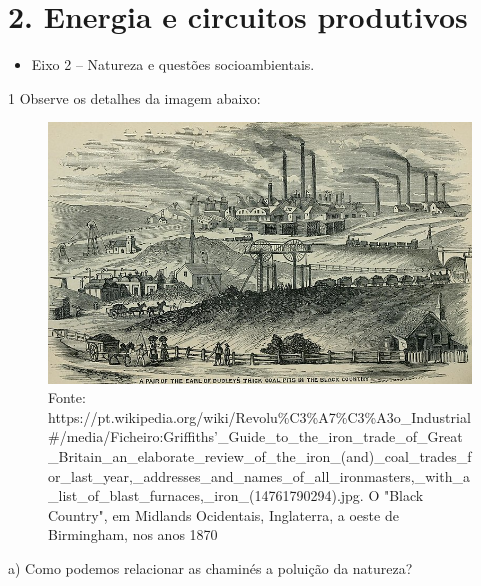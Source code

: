 \chapter{2. Energia e circuitos produtivos}




\begin{itemize}
\item Eixo 2 -- Natureza e questões socioambientais.
\end{itemize}

\num{1} Observe os detalhes da imagem abaixo:

\begin{figure}[htpb!]
\includegraphics[width=\textwidth]{./imgs/img5.jpg}
\caption{Fonte: https://pt.wikipedia.org/wiki/Revolu\%C3\%A7\%C3\%A3o\_Industrial\#/media/Ficheiro:Griffiths'\_Guide\_to\_the\_iron\_trade\_of\_Great\_Britain\_an\_elaborate\_review\_of\_the\_iron\_(and)\_coal\_trades\_for\_last\_year,\_addresses\_and\_names\_of\_all\_ironmasters,\_with\_a\_list\_of\_blast\_furnaces,\_iron\_(14761790294).jpg. O "Black Country", em Midlands Ocidentais, Inglaterra, a oeste de Birmingham, nos anos 1870}
\end{figure}


\num{a)} Como podemos relacionar as chaminés a poluição da natureza?

